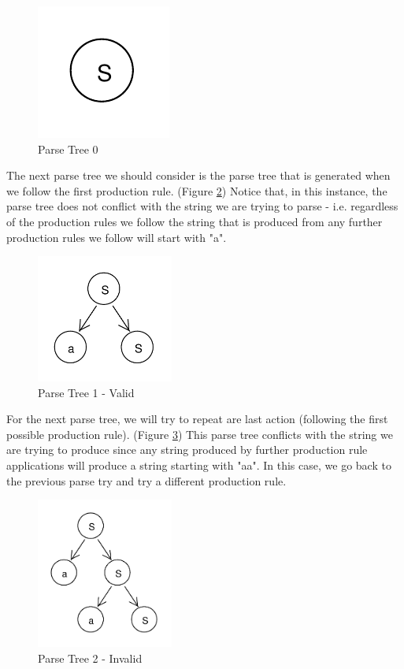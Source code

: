\documentclass[11pt]{article}
\begin{document}
\begin{figure}[h!]
    \centering
    \includegraphics[natwidth=15,natheight=15]{rdp_0.pdf}
    \caption{Parse Tree 0}
    \label{fig:rdp_0}
\end{figure}

The next parse tree we should consider is the parse tree that is generated when we follow the first 
production rule. (Figure \ref{fig:rdp_1}) Notice that, in this instance, the parse tree does not conflict with
the string we are trying to parse - i.e. regardless of the production rules we follow the string that is
produced from any further production rules we follow will start with "a".

\begin{figure}[h!]
    \centering
    \includegraphics[width=0.4\textwidth,natwidth=30,natheight=30]{rdp_1.pdf}
    \caption{Parse Tree 1 - Valid}
    \label{fig:rdp_1}
\end{figure}

For the next parse tree, we will try to repeat are last action (following the first possible production rule).
(Figure \ref{fig:rdp_2}) This parse tree conflicts with the string we are trying to produce since any
string produced by further production rule applications will produce a string starting with "aa".
In this case, we go back to the previous parse try and try a different production rule.

\begin{figure}[h!]
    \centering
    \includegraphics[width=0.4\textwidth,natwidth=30,natheight=30]{rdp_2.pdf}
    \caption{Parse Tree 2 - Invalid}
    \label{fig:rdp_2}
\end{figure}
\end{document}
